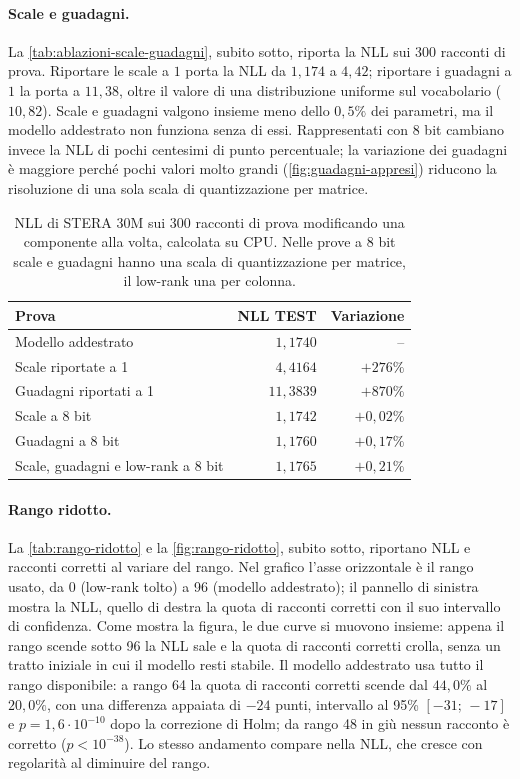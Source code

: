 \paragraph{Scale e guadagni.} La \autoref{tab:ablazioni-scale-guadagni}, subito sotto, riporta la NLL sui 300 racconti di prova. Riportare le scale a $1$ porta la NLL da $1{,}174$ a $4{,}42$; riportare i guadagni a $1$ la porta a $11{,}38$, oltre il valore di una distribuzione uniforme sul vocabolario ($10{,}82$). Scale e guadagni valgono insieme meno dello $0{,}5\%$ dei parametri, ma il modello addestrato non funziona senza di essi. Rappresentati con 8 bit cambiano invece la NLL di pochi centesimi di punto percentuale; la variazione dei guadagni è maggiore perché pochi valori molto grandi (\autoref{fig:guadagni-appresi}) riducono la risoluzione di una sola scala di quantizzazione per matrice.

\begin{table}[H]
\centering
\small
\begin{tabular}{lrr}
\toprule
Prova & NLL TEST & Variazione \\
\midrule
Modello addestrato & $1{,}1740$ & -- \\
\rowcolor{steraArancio!12} Scale riportate a 1 & $4{,}4164$ & $+276\%$ \\
\rowcolor{steraArancio!12} Guadagni riportati a 1 & $11{,}3839$ & $+870\%$ \\
Scale a 8 bit & $1{,}1742$ & $+0{,}02\%$ \\
Guadagni a 8 bit & $1{,}1760$ & $+0{,}17\%$ \\
Scale, guadagni e low-rank a 8 bit & $1{,}1765$ & $+0{,}21\%$ \\
\bottomrule
\end{tabular}
\caption{NLL di STERA 30M sui 300 racconti di prova modificando una componente alla volta, calcolata su CPU. Nelle prove a 8 bit scale e guadagni hanno una scala di quantizzazione per matrice, il low-rank una per colonna.}
\label{tab:ablazioni-scale-guadagni}
\end{table}

\paragraph{Rango ridotto.} La \autoref{tab:rango-ridotto} e la \autoref{fig:rango-ridotto}, subito sotto, riportano NLL e racconti corretti al variare del rango. Nel grafico l'asse orizzontale è il rango usato, da 0 (low-rank tolto) a 96 (modello addestrato); il pannello di sinistra mostra la NLL, quello di destra la quota di racconti corretti con il suo intervallo di confidenza. Come mostra la figura, le due curve si muovono insieme: appena il rango scende sotto 96 la NLL sale e la quota di racconti corretti crolla, senza un tratto iniziale in cui il modello resti stabile. Il modello addestrato usa tutto il rango disponibile: a rango 64 la quota di racconti corretti scende dal $44{,}0\%$ al $20{,}0\%$, con una differenza appaiata di $-24$ punti, intervallo al 95\% $[-31;\,-17]$ e $p=1{,}6\cdot10^{-10}$ dopo la correzione di Holm; da rango 48 in giù nessun racconto è corretto ($p<10^{-38}$). Lo stesso andamento compare nella NLL, che cresce con regolarità al diminuire del rango.

